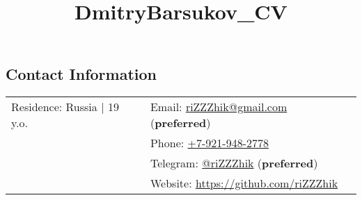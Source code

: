 \documentclass[margin,line]{res}
\begin{document}
\title{DmitryBarsukov_CV}

\begin{resume}

\section{\sc Contact Information}

\vspace{.05in}
\begin{tabular}{@{}p{2.30in}p{3in}}
Residence: Russia {|} 19 y.o.
& Email: \href{mailto:riZZZhik@gmail.com}{riZZZhik@gmail.com} (\textbf{preferred}) \\
& Phone: \href{tel:+79219482778}{+7-921-948-2778} \\
& Telegram: \href{https://t.me/riZZZhik}{@riZZZhik} (\textbf{preferred}) \\
& Website: \href{https://github.com/riZZZhik}{https://github.com/riZZZhik} \\
\end{tabular}



\newpage


\end{resume}
\end{document}
